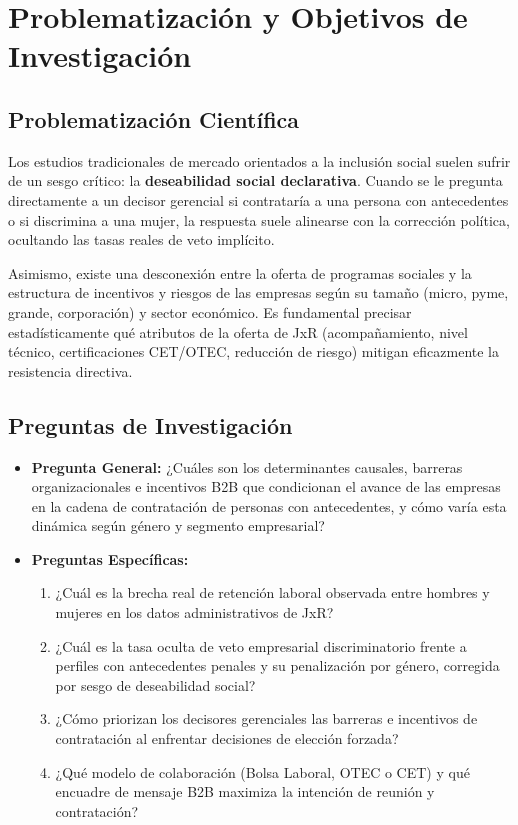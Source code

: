 \section{Problematización y Objetivos de Investigación}

\subsection{Problematización Científica}
Los estudios tradicionales de mercado orientados a la inclusión social suelen sufrir de un sesgo crítico: la \textbf{deseabilidad social declarativa}. Cuando se le pregunta directamente a un decisor gerencial si contrataría a una persona con antecedentes o si discrimina a una mujer, la respuesta suele alinearse con la corrección política, ocultando las tasas reales de veto implícito.

Asimismo, existe una desconexión entre la oferta de programas sociales y la estructura de incentivos y riesgos de las empresas según su tamaño (micro, pyme, grande, corporación) y sector económico. Es fundamental precisar estadísticamente qué atributos de la oferta de JxR (acompañamiento, nivel técnico, certificaciones CET/OTEC, reducción de riesgo) mitigan eficazmente la resistencia directiva.

\subsection{Preguntas de Investigación}
\begin{itemize}
    \item \textbf{Pregunta General:} ¿Cuáles son los determinantes causales, barreras organizacionales e incentivos B2B que condicionan el avance de las empresas en la cadena de contratación de personas con antecedentes, y cómo varía esta dinámica según género y segmento empresarial?
    \item \textbf{Preguntas Específicas:}
    \begin{enumerate}
        \item ¿Cuál es la brecha real de retención laboral observada entre hombres y mujeres en los datos administrativos de JxR?
        \item ¿Cuál es la tasa oculta de veto empresarial discriminatorio frente a perfiles con antecedentes penales y su penalización por género, corregida por sesgo de deseabilidad social?
        \item ¿Cómo priorizan los decisores gerenciales las barreras e incentivos de contratación al enfrentar decisiones de elección forzada?
        \item ¿Qué modelo de colaboración (Bolsa Laboral, OTEC o CET) y qué encuadre de mensaje B2B maximiza la intención de reunión y contratación?
    \end{enumerate}
\end{itemize}

